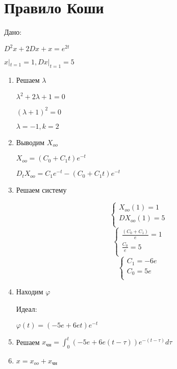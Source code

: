 \documentclass[a4paper, 12pt]{article}
\begin{document}
\section{Правило Коши}
Дано:

$D^2x+2Dx+x = e^{2t}$

$x|_{t=1}=1, Dx|_{t=1}=5$
\begin{enumerate}
    \item Решаем $\lambda$
    
    $\lambda^2+2\lambda+1=0$

    $(\lambda+1)^2=0$

    $\lambda=-1,k=2$
    \item Выводим $X_{oo}$
    
    $X_{oo}=(C_0+C_{1}t)e^{-t}$

    $D_tX_{oo}=C_1e^{-t}-(C_0+C_{1}t)e^{-t}$
    \item Решаем систему
    
\[
\left\{
\begin{aligned}
    X_{oo}(1)=1 \\
    DX_{oo}(1)=5 \\
\end{aligned}
\right.
\]  
\[
\left\{
\begin{aligned}
    \frac{(C_0+C_{1})}{e}=1 \\
    \frac{C_0}{e}=5 \\
\end{aligned}
\right.
\]  
\[
\left\{
\begin{aligned}
    C_1=-6e \\
    C_0=5e \\
\end{aligned}
\right.
\] 
    \item Находим $\varphi$
    
    Идеал: 

    $\varphi(t)=(-5e+6et)e^{-t}$

    \item Решаем $x_{\text{чн}}=\int_{0}^{t}(-5e+6e(t-\tau))e^{-(t-\tau)}d\tau$
    \item $x=x_{oo}+x_{\text{чн}}$
\end{enumerate}
\end{document}
